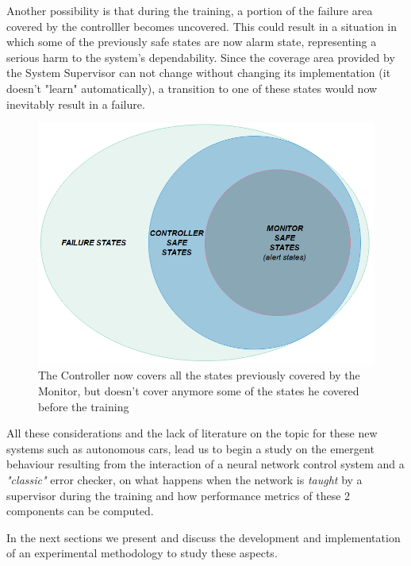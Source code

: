 Another possibility is that during the training, a portion of the failure area covered by the controlller becomes uncovered. This could result in a situation in which some of the previously safe states are now alarm state, representing a serious harm to the system's dependability. Since the coverage area provided by the System Supervisor can not change without changing its implementation (it doesn't "learn" automatically), a transition to one of these states would now inevitably result in a failure.

\begin{figure}[h!]
	\includegraphics[width=\textwidth]{img/area-growth-bad.png}
	\caption{The Controller now covers all the states previously covered by the Monitor, but doesn't cover anymore some of the states he covered before the training}
\end{figure}

All these considerations and the lack of literature on the topic for these new systems such as autonomous cars, lead us to begin a study on the emergent behaviour resulting from the interaction of a neural network control system and a \textsl{"classic"} error checker, on what happens when the network is \textsl{taught} by a supervisor during the training and how performance metrics of these 2 components can be computed.\newline

In the next sections we present and discuss the development and implementation of an experimental methodology to study these aspects.

